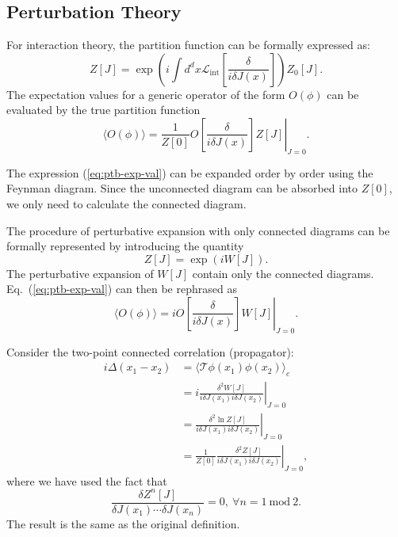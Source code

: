 \subsection{Perturbation Theory}
For interaction theory, the partition function can be formally expressed as:
\begin{equation}
	Z[J] = \exp\left(i\int d^dx \mathcal{L}_{\mathrm{int}}\left[\frac{\delta}{i\delta J(x)}\right]\right)Z_0[J].
\end{equation}
The expectation values for a generic operator of the form $O(\phi)$ can be evaluated by the true partition function
\begin{equation}
	\langle O(\phi)\rangle
	= \frac{1}{Z[0]} \left. O\left[\frac{\delta}{i\delta J(x)}\right] Z[J] \right|_{J=0}.
	\label{eq:ptb-exp-val}
\end{equation}

The expression (\ref{eq:ptb-exp-val}) can be expanded order by order using the Feynman diagram. 
Since the unconnected diagram can be absorbed into $Z[0]$, we only need to calculate the connected diagram.

The procedure of perturbative expansion with only connected diagrams can be formally represented by introducing the quantity
\begin{equation}
	Z[J] = \exp\left(i W[J]\right).
\end{equation}
The perturbative expansion of $W[J]$ contain only the connected diagrams.
Eq.~(\ref{eq:ptb-exp-val}) can then be rephrased as
\begin{equation}
	\langle O(\phi)\rangle
	= i\left. O\left[\frac{\delta}{i\delta J(x)}\right] W[J] \right|_{J=0}.
\end{equation}

\begin{framedexpl}
Consider the two-point connected correlation (propagator):
\begin{equation*}
\begin{aligned}
	i\Delta(x_1-x_2)
	&= \langle \mathcal{T}\phi(x_1) \phi(x_2)\rangle_c \\
	&= i\left.\frac{\delta^2 W[J]}{i\delta J(x_1) i\delta J(x_2)}\right|_{J=0} \\
	&= \left.\frac{\delta^2 \ln Z[J]}{i\delta J(x_1) i\delta J(x_2)}\right|_{J=0}\\
	&= \frac{1}{Z[0]}\left.\frac{\delta^2 Z[J]}{i\delta J(x_1)i\delta J(x_2)}\right|_{J=0},
\end{aligned}
\end{equation*}
where we have used the fact that
\begin{equation*}
	\frac{\delta Z^n[J]}{\delta J(x_1) \cdots \delta J(x_n)} = 0,\ \forall n = 1\ \mathrm{mod}\ 2.
\end{equation*}
The result is the same as the original definition.
\end{framedexpl}

